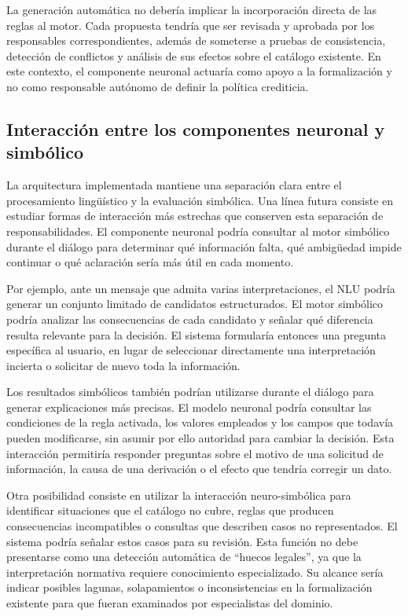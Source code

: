\documentclass[12pt,a4paper]{report}
\begin{document}
La generación automática no debería implicar la incorporación directa de las reglas al motor. Cada propuesta tendría que ser revisada y aprobada por los responsables correspondientes, además de someterse a pruebas de consistencia, detección de conflictos y análisis de sus efectos sobre el catálogo existente. En este contexto, el componente neuronal actuaría como apoyo a la formalización y no como responsable autónomo de definir la política crediticia.

\subsection{Interacción entre los componentes neuronal y simbólico}

La arquitectura implementada mantiene una separación clara entre el procesamiento lingüístico y la evaluación simbólica. Una línea futura consiste en estudiar formas de interacción más estrechas que conserven esta separación de responsabilidades. El componente neuronal podría consultar al motor simbólico durante el diálogo para determinar qué información falta, qué ambigüedad impide continuar o qué aclaración sería más útil en cada momento.

Por ejemplo, ante un mensaje que admita varias interpretaciones, el NLU podría generar un conjunto limitado de candidatos estructurados. El motor simbólico podría analizar las consecuencias de cada candidato y señalar qué diferencia resulta relevante para la decisión. El sistema formularía entonces una pregunta específica al usuario, en lugar de seleccionar directamente una interpretación incierta o solicitar de nuevo toda la información.

Los resultados simbólicos también podrían utilizarse durante el diálogo para generar explicaciones más precisas. El modelo neuronal podría consultar las condiciones de la regla activada, los valores empleados y los campos que todavía pueden modificarse, sin asumir por ello autoridad para cambiar la decisión. Esta interacción permitiría responder preguntas sobre el motivo de una solicitud de información, la causa de una derivación o el efecto que tendría corregir un dato.

Otra posibilidad consiste en utilizar la interacción neuro-simbólica para identificar situaciones que el catálogo no cubre, reglas que producen consecuencias incompatibles o consultas que describen casos no representados. El sistema podría señalar estos casos para su revisión. Esta función no debe presentarse como una detección automática de ``huecos legales'', ya que la interpretación normativa requiere conocimiento especializado. Su alcance sería indicar posibles lagunas, solapamientos o inconsistencias en la formalización existente para que fueran examinados por especialistas del dominio.
\end{document}
